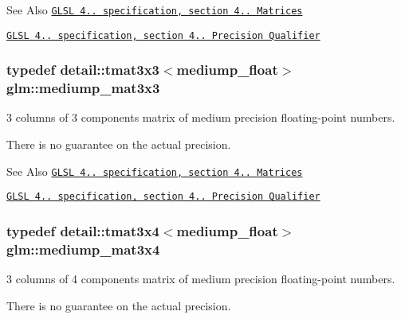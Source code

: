 \begin{DoxySeeAlso}{See Also}
\href{http://www.opengl.org/registry/doc/GLSLangSpec.4.20.8.pdf}{\tt G\-L\-S\-L 4.. specification, section 4.. Matrices} 

\href{http://www.opengl.org/registry/doc/GLSLangSpec.4.20.8.pdf}{\tt G\-L\-S\-L 4.. specification, section 4.. Precision Qualifier} 
\end{DoxySeeAlso}
\hypertarget{group__core__precision_ga21bb45bd57a97bf7b0b41e86328d72b2}{
\subsubsection[{mediump\-\_\-mat3x3}]{\setlength{\rightskip}{0pt plus 5cm}typedef detail\-::tmat3x3$<$mediump\-\_\-float$>$ {\bf glm\-::mediump\-\_\-mat3x3}}}\label{group__core__precision_ga21bb45bd57a97bf7b0b41e86328d72b2}


3 columns of 3 components matrix of medium precision floating-\/point numbers. 

There is no guarantee on the actual precision.

\begin{DoxySeeAlso}{See Also}
\href{http://www.opengl.org/registry/doc/GLSLangSpec.4.20.8.pdf}{\tt G\-L\-S\-L 4.. specification, section 4.. Matrices} 

\href{http://www.opengl.org/registry/doc/GLSLangSpec.4.20.8.pdf}{\tt G\-L\-S\-L 4.. specification, section 4.. Precision Qualifier} 
\end{DoxySeeAlso}
\hypertarget{group__core__precision_gaa530d8f06a8f1187cd1e0c2ce46cac42}{
\subsubsection[{mediump\-\_\-mat3x4}]{\setlength{\rightskip}{0pt plus 5cm}typedef detail\-::tmat3x4$<$mediump\-\_\-float$>$ {\bf glm\-::mediump\-\_\-mat3x4}}}\label{group__core__precision_gaa530d8f06a8f1187cd1e0c2ce46cac42}


3 columns of 4 components matrix of medium precision floating-\/point numbers. 

There is no guarantee on the actual precision.

